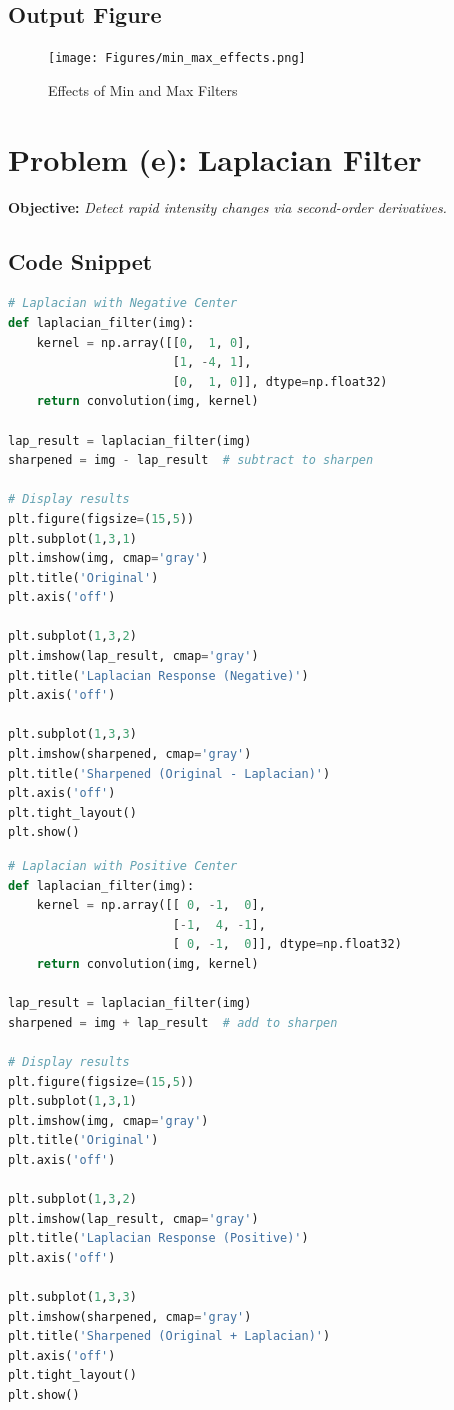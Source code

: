 \documentclass[12pt,a4paper]{report}
\begin{document}
\subsection{Output Figure}
\begin{figure}[H]
\centering
\texttt{[image: Figures/min\_max\_effects.png]}
\caption{Effects of Min and Max Filters}
\end{figure}

\section{Problem (e): Laplacian Filter}
\textbf{Objective:} \textit{Detect rapid intensity changes via second-order derivatives.}

\subsection{Code Snippet}
\begin{lstlisting}[language=Python, caption={Laplacian Filtering - Negative Kernel}]
# Laplacian with Negative Center
def laplacian_filter(img):
    kernel = np.array([[0,  1, 0],
                       [1, -4, 1],
                       [0,  1, 0]], dtype=np.float32)
    return convolution(img, kernel)

lap_result = laplacian_filter(img)
sharpened = img - lap_result  # subtract to sharpen

# Display results
plt.figure(figsize=(15,5))
plt.subplot(1,3,1)
plt.imshow(img, cmap='gray')
plt.title('Original')
plt.axis('off')

plt.subplot(1,3,2)
plt.imshow(lap_result, cmap='gray')
plt.title('Laplacian Response (Negative)')
plt.axis('off')

plt.subplot(1,3,3)
plt.imshow(sharpened, cmap='gray')
plt.title('Sharpened (Original - Laplacian)')
plt.axis('off')
plt.tight_layout()
plt.show()
\end{lstlisting}

\begin{lstlisting}[language=Python, caption={Laplacian Filtering - Positive Kernel}]
# Laplacian with Positive Center
def laplacian_filter(img):
    kernel = np.array([[ 0, -1,  0],
                       [-1,  4, -1],
                       [ 0, -1,  0]], dtype=np.float32)
    return convolution(img, kernel)

lap_result = laplacian_filter(img)
sharpened = img + lap_result  # add to sharpen

# Display results
plt.figure(figsize=(15,5))
plt.subplot(1,3,1)
plt.imshow(img, cmap='gray')
plt.title('Original')
plt.axis('off')

plt.subplot(1,3,2)
plt.imshow(lap_result, cmap='gray')
plt.title('Laplacian Response (Positive)')
plt.axis('off')

plt.subplot(1,3,3)
plt.imshow(sharpened, cmap='gray')
plt.title('Sharpened (Original + Laplacian)')
plt.axis('off')
plt.tight_layout()
plt.show()
\end{lstlisting}
\end{document}
